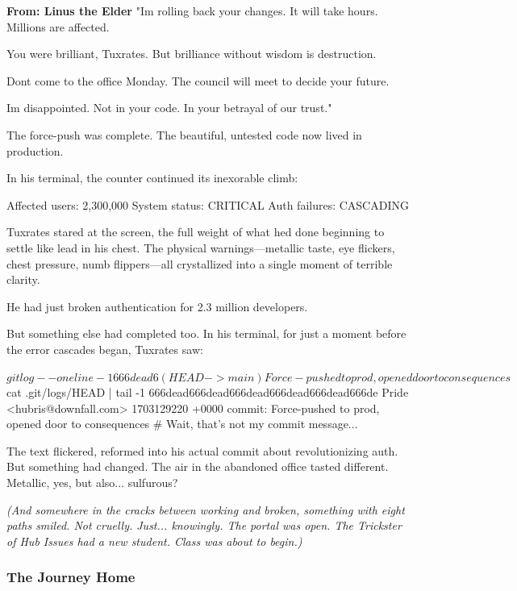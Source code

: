 \textbf{From: Linus the Elder} "I\textquotesingle m rolling back your changes. It will take hours. Millions are affected.

You were brilliant, Tuxrates. But brilliance without wisdom is destruction.

Don\textquotesingle t come to the office Monday. The council will meet to decide your future.

I\textquotesingle m disappointed. Not in your code. In your betrayal of our trust."

The force-push was complete. The beautiful, untested code now lived in production.

In his terminal, the counter continued its inexorable climb:

\begin{codeblock}
Affected users: 2,300,000
System status: CRITICAL
Auth failures: CASCADING
\end{codeblock}

Tuxrates stared at the screen, the full weight of what he\textquotesingle d done beginning to settle like lead in his chest. The physical warnings---metallic taste, eye flickers, chest pressure, numb flippers---all crystallized into a single moment of terrible clarity.

He had just broken authentication for 2.3 million developers.

But something else had completed too. In his terminal, for just a moment before the error cascades began, Tuxrates saw:

\begin{codeblock}
$ git log --oneline -1
666dead6 (HEAD -> main) Force-pushed to prod, opened door to consequences

$ cat .git/logs/HEAD | tail -1
666dead666dead666dead666dead666dead666de Pride <hubris@downfall.com> 1703129220 +0000 commit: Force-pushed to prod, opened door to consequences
# Wait, that's not my commit message...
\end{codeblock}

The text flickered, reformed into his actual commit about revolutionizing auth. But something had changed. The air in the abandoned office tasted different. Metallic, yes, but also... sulfurous?

\emph{(And somewhere in the cracks between working and broken, something with eight paths smiled. Not cruelly. Just... knowingly. The portal was open. The Trickster of Hub Issues had a new student. Class was about to begin.)}

\subsubsection{The Journey Home}\label{the-journey-home}

